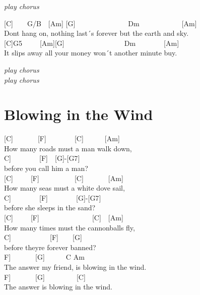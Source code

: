 \documentclass[
  letterpaper,
  a5paper]{memoir}
\begin{document}
\emph{play chorus}

{[}C{]}~~~~G/B~~{[}Am{]} {[}G{]}~~~~~~~~~~~~~~~Dm~~~~~~~~~~~~{[}Am{]}\\
Don\textquotesingle t hang on, nothing last´s forever but the earth and
sky.\\
{[}C{]}G5~~~~~{[}Am{]}{[}G{]}~~~~~~~~~~~~~~~~~Dm~~~~~~~~{[}Am{]}\\
It slips away all your money won´t another minute buy.

\emph{play chorus}\\
\emph{play chorus}

\hypertarget{blowing-in-the-wind}{%
\chapter{Blowing in the Wind}\label{blowing-in-the-wind}}

{[}C{]}~~~~~~~{[}F{]}~~~~~~~~{[}C{]}~~~~~~{[}Am{]}\\
How many roads must a man walk down,\\
\hspace*{0.333em}\hspace*{0.333em}{[}C{]}~~~~~~~~{[}F{]}~~{[}G{]}-{[}G7{]}\\
before you call him a man?\\
{[}C{]}~~~~~{[}F{]}~~~~~~~~~~{[}C{]}~~~~~~~{[}Am{]}\\
How many seas must a white dove sail,\\
\hspace*{0.333em}\hspace*{0.333em}{[}C{]}~~~~~~~~{[}F{]}~~~~~~~~{[}G{]}-{[}G7{]}\\
before she sleeps in the sand?\\
{[}C{]}~~~~~{[}F{]}~~~~~~~~~~~~~~~{[}C{]}~~{[}Am{]}\\
How many times must the cannonballs fly,\\
\hspace*{0.333em}\hspace*{0.333em}{[}C{]}~~~~~~~~~~~{[}F{]}~~~~{[}G{]}\\
before they\textquotesingle re forever banned?\\
\hspace*{0.333em}\hspace*{0.333em}\hspace*{0.333em}\hspace*{0.333em}\hspace*{0.333em}\hspace*{0.333em}{[}F{]}~~~~~~~{[}G{]}~~~~~~C
Am~~~~~~~~~~~~\\
The answer my friend, is blowing in the wind.\\
\hspace*{0.333em}\hspace*{0.333em}\hspace*{0.333em}\hspace*{0.333em}\hspace*{0.333em}\hspace*{0.333em}{[}F{]}~~~~~~~{[}G{]}~~~~~~~~~{[}C{]}\\
The answer is blowing in the wind.
\end{document}
